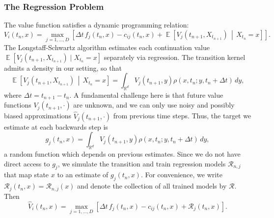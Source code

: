 \documentclass[11pt,reqno,a4paper]{amsart}
\theoremstyle{definition}
\numberwithin{equation}{section}
\DeclareMathOperator{\E}{\mathbb{E}}
\DeclareMathOperator{\R}{\mathbb{R}}
\DeclareMathOperator{\1}{\mathbbm{1}}
\begin{document}
\subsubsection{The Regression Problem}\label{sec:regression}
The value function satisfies a dynamic programming relation:
\begin{equation} \label{eq:dpp}
  {V}_i(t_n,x) = \max_{j=1,\dots,D} \left[ \Delta t \, f_j(t_n,x)
    - c_{ij}(t_n,x) + \E\left[{V}_j(t_{n+1},X_{t_{n+1}})
    \,\middle\vert\, X_{t_n} = x\right] \right].
\end{equation}
The Longstaff-Schwartz algorithm estimates each continuation value $\E[V_j(t_{n+1},X_{t_{n+1}}) \mid X_{t_n}=x]$ separately via regression. The transition kernel admits a density in our setting, so that 
\begin{equation*}
\E\left[{V}_j(t_{n+1},X_{t_{n+1}})\,\middle\vert\, X_{t_n} = x\right] = \int_{\R^d}{V}_j(t_{n+1},y)\rho(x,t_n;y,t_n+\Delta t)\,dy,
\end{equation*}
where $\Delta t=t_{n+1}-t_n$. A fundamental challenge here is that future value functions $V_j(t_{n+1}, \cdot)$ are unknown, and we can only use noisy and possibly biased approximations $\widehat{V}_j(t_{n+1}, \cdot)$ from previous time steps. Thus, the target we estimate at each backwards step is
\begin{equation} \label{eq:gj}
  g_j(t_n,x) = \int_{\R^d}{\widehat V}_j(t_{n+1},y)\rho(x,t_n;y,t_n+\Delta t)\,dy,
\end{equation}
a random function which depends on previous estimates.
Since we do not have direct access to $g_j$, we simulate the transition and train regression models $\mathcal{R}_{n,j}$ that map state $x$ to an estimate of $g_j(t_n,x)$. For convenience, we write $\mathcal{R}_j(t_n,x) = \mathcal{R}_{n,j}(x)$ and denote the collection of all trained models by $\mathcal{R}$. Then
\begin{equation}\label{eq:Vhat:reconstruction}
  \widehat{V}_i(t_n,x) = \max_{j=1,\dots,D}\left[\Delta t\,f_j(t_n,x)
    - c_{ij}(t_n,x) + \mathcal{R}_j(t_n,x)\right].
\end{equation}
\end{document}
